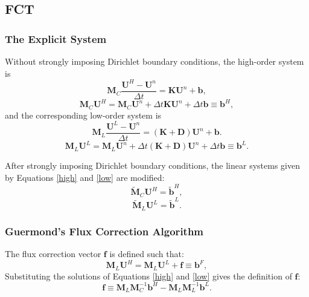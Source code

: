 \subsection{FCT}
\subsubsection{The Explicit System}
Without strongly imposing Dirichlet boundary conditions, the high-order system is
\begin{equation}
   \mathbf{M}_C\frac{\mathbf{U}^H-\mathbf{U}^n}{\Delta t}
      = \mathbf{K}\mathbf{U}^n + \mathbf{b},
\end{equation}
\begin{equation}\label{high}
   \mathbf{M}_C\mathbf{U}^H = \mathbf{M}_C\mathbf{U}^n
      + \Delta t\mathbf{K}\mathbf{U}^n + \Delta t\mathbf{b} \equiv \mathbf{b}^H,
\end{equation}
and the corresponding low-order system is
\begin{equation}
   \mathbf{M}_L\frac{\mathbf{U}^L-\mathbf{U}^n}{\Delta t}
      = (\mathbf{K} + \mathbf{D})\mathbf{U}^n + \mathbf{b}.
\end{equation}
\begin{equation}\label{low}
   \mathbf{M}_L\mathbf{U}^L = \mathbf{M}_L\mathbf{U}^n
      + \Delta t(\mathbf{K} + \mathbf{D})\mathbf{U}^n + \Delta t\mathbf{b}
      \equiv \mathbf{b}^L.
\end{equation}

After strongly imposing Dirichlet boundary conditions, the linear
systems given by Equations \ref{high} and \ref{low} are modified:
\begin{equation}\label{highD}
   \tilde{\mathbf{M}}_C\mathbf{U}^H = \tilde{\mathbf{b}}^H,
\end{equation}
\begin{equation}\label{lowD}
   \tilde{\mathbf{M}}_L\mathbf{U}^L = \tilde{\mathbf{b}}^L.
\end{equation}
\subsubsection{Guermond's Flux Correction Algorithm}
The flux correction vector $\mathbf{f}$ is defined such that:
\begin{equation}\label{fc}
   \mathbf{M}_L\mathbf{U}^H = \mathbf{M}_L\mathbf{U}^L + \mathbf{f} \equiv \mathbf{b}^F,
\end{equation}
Substituting the solutions of Equations \ref{high} and \ref{low} gives the definition
of $\mathbf{f}$:
\begin{equation}\label{Fdef}
   \mathbf{f} \equiv \mathbf{M}_L\mathbf{M}_C^{-1}\mathbf{b}^H
      -\mathbf{M}_L\mathbf{M}_L^{-1}\mathbf{b}^L.
\end{equation}

